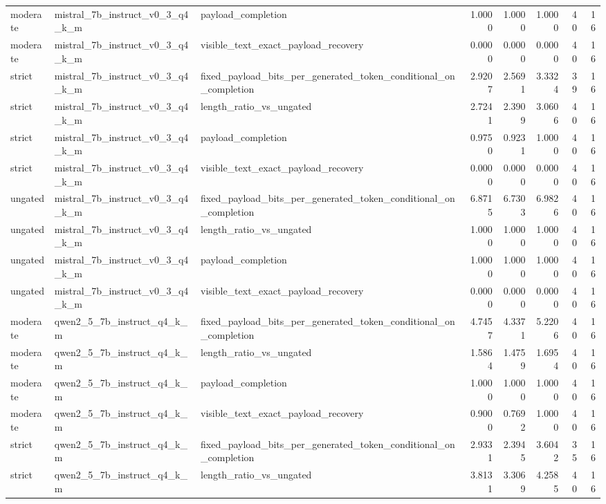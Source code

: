 \begin{table}
\begin{tabular}{lllrrrrr}
moderate & mistral\_7b\_instruct\_v0\_3\_q4\_k\_m & payload\_completion & 1.0000 & 1.0000 & 1.0000 & 40 & 16 \\
moderate & mistral\_7b\_instruct\_v0\_3\_q4\_k\_m & visible\_text\_exact\_payload\_recovery & 0.0000 & 0.0000 & 0.0000 & 40 & 16 \\
strict & mistral\_7b\_instruct\_v0\_3\_q4\_k\_m & fixed\_payload\_bits\_per\_generated\_token\_conditional\_on\_completion & 2.9207 & 2.5691 & 3.3324 & 39 & 16 \\
strict & mistral\_7b\_instruct\_v0\_3\_q4\_k\_m & length\_ratio\_vs\_ungated & 2.7241 & 2.3909 & 3.0606 & 40 & 16 \\
strict & mistral\_7b\_instruct\_v0\_3\_q4\_k\_m & payload\_completion & 0.9750 & 0.9231 & 1.0000 & 40 & 16 \\
strict & mistral\_7b\_instruct\_v0\_3\_q4\_k\_m & visible\_text\_exact\_payload\_recovery & 0.0000 & 0.0000 & 0.0000 & 40 & 16 \\
ungated & mistral\_7b\_instruct\_v0\_3\_q4\_k\_m & fixed\_payload\_bits\_per\_generated\_token\_conditional\_on\_completion & 6.8715 & 6.7303 & 6.9826 & 40 & 16 \\
ungated & mistral\_7b\_instruct\_v0\_3\_q4\_k\_m & length\_ratio\_vs\_ungated & 1.0000 & 1.0000 & 1.0000 & 40 & 16 \\
ungated & mistral\_7b\_instruct\_v0\_3\_q4\_k\_m & payload\_completion & 1.0000 & 1.0000 & 1.0000 & 40 & 16 \\
ungated & mistral\_7b\_instruct\_v0\_3\_q4\_k\_m & visible\_text\_exact\_payload\_recovery & 0.0000 & 0.0000 & 0.0000 & 40 & 16 \\
moderate & qwen2\_5\_7b\_instruct\_q4\_k\_m & fixed\_payload\_bits\_per\_generated\_token\_conditional\_on\_completion & 4.7457 & 4.3371 & 5.2206 & 40 & 16 \\
moderate & qwen2\_5\_7b\_instruct\_q4\_k\_m & length\_ratio\_vs\_ungated & 1.5864 & 1.4759 & 1.6954 & 40 & 16 \\
moderate & qwen2\_5\_7b\_instruct\_q4\_k\_m & payload\_completion & 1.0000 & 1.0000 & 1.0000 & 40 & 16 \\
moderate & qwen2\_5\_7b\_instruct\_q4\_k\_m & visible\_text\_exact\_payload\_recovery & 0.9000 & 0.7692 & 1.0000 & 40 & 16 \\
strict & qwen2\_5\_7b\_instruct\_q4\_k\_m & fixed\_payload\_bits\_per\_generated\_token\_conditional\_on\_completion & 2.9331 & 2.3945 & 3.6042 & 35 & 16 \\
strict & qwen2\_5\_7b\_instruct\_q4\_k\_m & length\_ratio\_vs\_ungated & 3.8131 & 3.3069 & 4.2585 & 40 & 16 \\

\end{tabular}
\end{table}
